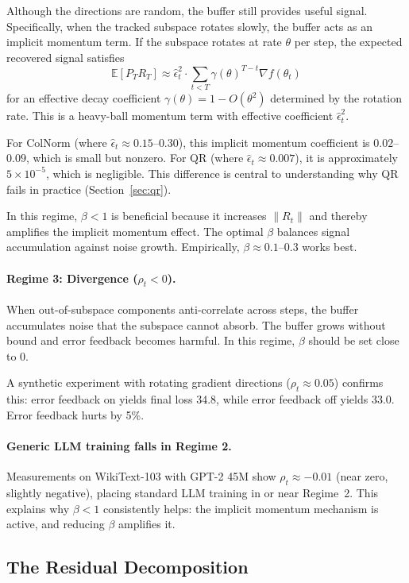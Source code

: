 \documentclass[11pt]{article}
\newcommand{\norm}[1]{\|#1\|}
\begin{document}
Although the directions are random, the buffer still provides useful signal. Specifically, when the tracked subspace rotates slowly, the buffer acts as an implicit momentum term. If the subspace rotates at rate $\theta$ per step, the expected recovered signal satisfies
\[
\mathbb{E}[P_{T} R_T] \approx \hat{\epsilon}_t^2 \cdot \sum_{t < T} \gamma(\theta)^{T-t} \nabla f(\theta_t)
\]
for an effective decay coefficient $\gamma(\theta) = 1 - O(\theta^2)$ determined by the rotation rate. This is a heavy-ball momentum term with effective coefficient $\hat{\epsilon}_t^2$.

For ColNorm (where $\hat{\epsilon}_t \approx 0.15$--$0.30$), this implicit momentum coefficient is $0.02$--$0.09$, which is small but nonzero. For QR (where $\hat{\epsilon}_t \approx 0.007$), it is approximately $5 \times 10^{-5}$, which is negligible. This difference is central to understanding why QR fails in practice (Section~\ref{sec:qr}).

In this regime, $\beta < 1$ is beneficial because it increases $\norm{R_t}$ and thereby amplifies the implicit momentum effect. The optimal $\beta$ balances signal accumulation against noise growth. Empirically, $\beta \approx 0.1$--$0.3$ works best.

\paragraph{Regime 3: Divergence ($\rho_t < 0$).} When out-of-subspace components anti-correlate across steps, the buffer accumulates noise that the subspace cannot absorb. The buffer grows without bound and error feedback becomes harmful. In this regime, $\beta$ should be set close to 0.

A synthetic experiment with rotating gradient directions ($\rho_t \approx 0.05$) confirms this: error feedback on yields final loss 34.8, while error feedback off yields 33.0. Error feedback hurts by 5\%.

\paragraph{Generic LLM training falls in Regime 2.} Measurements on WikiText-103 with GPT-2 45M show $\rho_t \approx -0.01$ (near zero, slightly negative), placing standard LLM training in or near Regime~2. This explains why $\beta < 1$ consistently helps: the implicit momentum mechanism is active, and reducing $\beta$ amplifies it.

\subsection{The Residual Decomposition}
\end{document}
